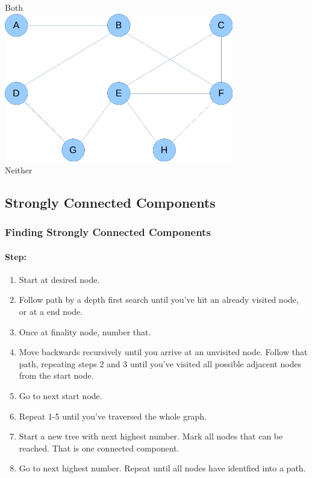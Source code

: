 \documentclass[10pt]{article}
\begin{document}
\begin{center}
    Both\\
    \includegraphics[width=10cm]{e4.png}\\
    Neither\\
\end{center}

\subsection{Strongly Connected Components}
\subsubsection{Finding Strongly Connected Components}
\paragraph{Step:}
\begin{enumerate}
    \item Start at desired node.
    \item Follow path by a depth first search until you've hit an already visited node, or at a end node.
    \item Once at finality node, number that.
    \item Move backwards recursively until you arrive at an unvisited node. Follow that path, repeating steps 2 and 3 until you've visited all possible adjacent nodes from the start node.
    \item Go to next start node.
    \item Repeat 1-5 until you've traversed the whole graph.
    \item Start a new tree with next highest number. Mark all nodes that can be reached. That is one connected component.
    \item Go to next highest number. Repeat until all nodes have identfied into a path.
\end{enumerate}
\end{document}
